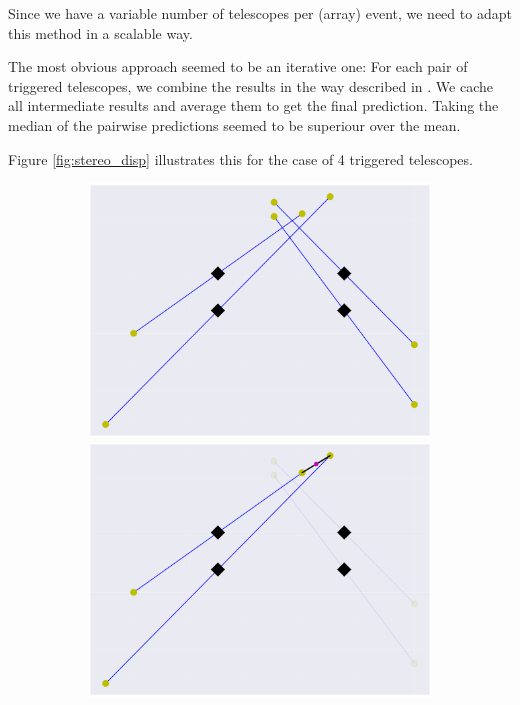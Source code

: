 Since we have a variable number of telescopes per (array) event,
we need to adapt this method in a scalable way.

The most obvious approach seemed to be an iterative one:
For each pair of triggered telescopes, we combine the results 
in the way described in \cite{disp magic paper}.
We cache all intermediate results and average them to get the final prediction.
Taking the median of the pairwise predictions seemed to be superiour
over the mean.

Figure \ref{fig:stereo_disp} illustrates this for the case of 4 triggered telescopes.


\begin{figure}
    \centering
    \begin{subfigure}{0.45\textwidth}
        \includegraphics[width=0.8\linewidth]{Plots/stereo_magic_all.pdf} 
        \includegraphics[width=0.8\linewidth]{Plots/stereo_magic_2.pdf} 
    \end{subfigure}
    \begin{subfigure}{0.45\textwidth}

\end{subfigure}
\end{figure}
